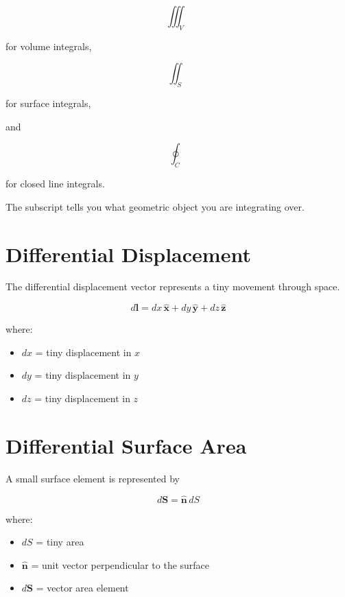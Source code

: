 \documentclass[11pt]{article}
\newcommand{\vect}[1]{\mathbf{#1}}
\newcommand{\uvect}[1]{\hat{\mathbf{#1}}}
\begin{document}
\[
\iiint_V
\]

for volume integrals,

\[
\iint_S
\]

for surface integrals,

and

\[
\oint_C
\]

for closed line integrals.

The subscript tells you what geometric object you are integrating over.



\section{Differential Displacement}

The differential displacement vector represents a tiny movement through space.

\[
\boxed{
d\vect{l}
=
dx\,\uvect{x}
+
dy\,\uvect{y}
+
dz\,\uvect{z}
}
\]

where:

\begin{itemize}
    \item $dx$ = tiny displacement in $x$
    \item $dy$ = tiny displacement in $y$
    \item $dz$ = tiny displacement in $z$
\end{itemize}



\section{Differential Surface Area}

A small surface element is represented by

\[
\boxed{
d\vect{S}
=
\hat{\vect{n}}\,dS
}
\]

where:

\begin{itemize}
    \item $dS$ = tiny area
    \item $\hat{\vect{n}}$ = unit vector perpendicular to the surface
    \item $d\vect{S}$ = vector area element
\end{itemize}
\end{document}
